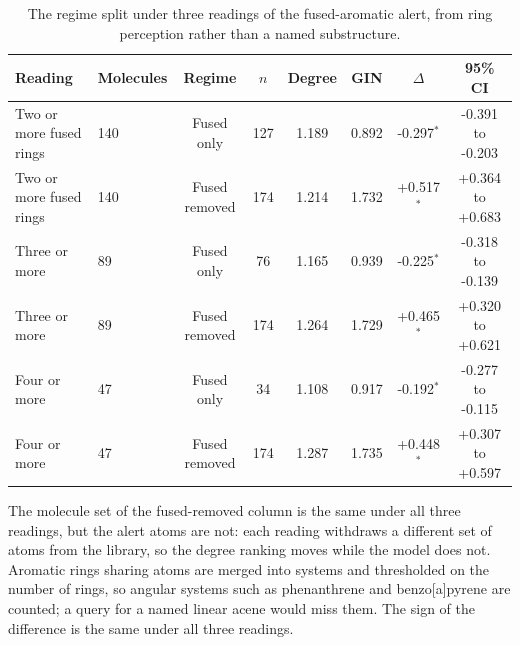 \begin{table}[htbp]
\centering
\caption{The regime split under three readings of the fused-aromatic alert, from ring perception rather than a named substructure.}
\label{tab:si_pattern}
\footnotesize
\setlength{\tabcolsep}{4pt}
\begin{tabular}{llcccccc}
\toprule
Reading & Molecules & Regime & $n$ & Degree & GIN & $\Delta$ & 95\% CI \\
\midrule
Two or more fused rings & 140 & Fused only & 127 & 1.189 & 0.892 & -0.297$^{*}$ & -0.391 to -0.203 \\
Two or more fused rings & 140 & Fused removed & 174 & 1.214 & 1.732 & +0.517$^{*}$ & +0.364 to +0.683 \\
Three or more & 89 & Fused only & 76 & 1.165 & 0.939 & -0.225$^{*}$ & -0.318 to -0.139 \\
Three or more & 89 & Fused removed & 174 & 1.264 & 1.729 & +0.465$^{*}$ & +0.320 to +0.621 \\
Four or more & 47 & Fused only & 34 & 1.108 & 0.917 & -0.192$^{*}$ & -0.277 to -0.115 \\
Four or more & 47 & Fused removed & 174 & 1.287 & 1.735 & +0.448$^{*}$ & +0.307 to +0.597 \\
\bottomrule
\end{tabular}
\begin{flushleft}\footnotesize The molecule set of the fused-removed column is the same under all three readings, but the alert atoms are not: each reading withdraws a different set of atoms from the library, so the degree ranking moves while the model does not. Aromatic rings sharing atoms are merged into systems and thresholded on the number of rings, so angular systems such as phenanthrene and benzo[a]pyrene are counted; a query for a named linear acene would miss them. The sign of the difference is the same under all three readings.\end{flushleft}
\end{table}
